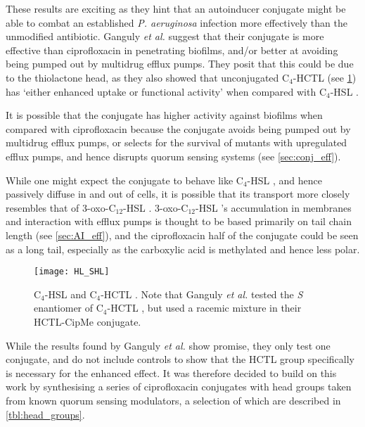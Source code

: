 These results are exciting as they hint that an autoinducer conjugate might be able to combat an established \textit{P. aeruginosa} infection more effectively than the unmodified antibiotic. 
Ganguly \textit{et al.} suggest that their conjugate is more effective than ciprofloxacin in penetrating biofilms, and/or better at avoiding being pumped out by multidrug efflux pumps. They posit that this could be due to the thiolactone head, as they also showed that unconjugated C$_4$-HCTL  (see \ref{fgr:HL_SHL}) has `either enhanced uptake or functional activity' when compared with C$_4$-HSL . 

It is possible that the conjugate  has higher activity against biofilms when compared with ciprofloxacin  because the conjugate  avoids being pumped out by multidrug efflux pumps, or selects for the survival of mutants with upregulated efflux pumps, and hence disrupts quorum sensing systems (see \ref{sec:conj_eff}).

While one might expect the conjugate  to behave like C$_4$-HSL , and hence passively diffuse in and out of cells, it is possible that its transport more closely resembles that of 3-oxo-C$_{12}$-HSL . 3-oxo-C$_{12}$-HSL 's accumulation in membranes and interaction with efflux pumps is thought to be based primarily on tail chain length (see \ref{sec:AI_eff}), and the ciprofloxacin half of the conjugate  could be seen as a long tail, especially as the carboxylic acid is methylated and hence less polar.

\begin{figure}[H]
	\begin{center}
		\texttt{[image: HL\_SHL]}
		\caption{
		C$_4$-HSL  and C$_4$-HCTL . Note that Ganguly \textit{et al.} tested the \textit{S} enantiomer of C$_4$-HCTL , but used a racemic mixture in their HCTL-CipMe conjugate. %
		\label{fgr:HL_SHL}}
	\end{center}
\end{figure}

While the results found by Ganguly \textit{et al.} show promise, they only test one conjugate, and do not include controls to show that the HCTL group specifically is necessary for the enhanced effect.
It was therefore decided to build on this work by synthesising a series of ciprofloxacin conjugates with head groups taken from known quorum sensing modulators\cite{Galloway2011,Hodgkinson2012a}, a selection of which are described in \ref{tbl:head_groups}. 


